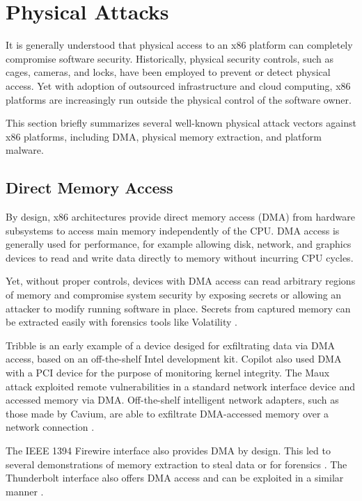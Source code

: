 \section{Physical Attacks}
\label{sec:physical}

It is generally understood that physical access to an x86 platform can
completely compromise software security. Historically, physical
security controls, such as cages, cameras, and locks, have been employed to
prevent or detect physical access. Yet with adoption of
outsourced infrastructure and cloud computing, x86 platforms are
increasingly run outside the physical control of the software owner.

This section briefly summarizes several well-known physical attack vectors
against x86 platforms, including DMA, physical memory extraction, and
platform malware.

\subsection{Direct Memory Access}

By design, x86 architectures provide direct memory access (DMA) from
hardware subsystems to access main memory independently of the
CPU. DMA access is generally used for performance, for example
allowing disk, network, and graphics devices to read and write
data directly to memory without incurring CPU cycles.

Yet, without proper controls, devices with DMA access can read
arbitrary regions of memory and compromise system security by exposing
secrets or allowing an attacker to modify running software in
place. Secrets from captured memory can be extracted easily with
forensics tools like Volatility \cite{Volatility:2014}.

Tribble \cite{Carrier:2004hardware, Grand:2007patent} is an
early example of a device desiged for exfiltrating data via DMA
access, based on an off-the-shelf Intel development kit. Copilot
\cite{Petroni:2004copilot} also used DMA with a PCI device for the
purpose of monitoring kernel integrity. The Maux attack
\cite{Triulzi:2008vd} exploited remote vulnerabilities in a standard
network interface device and accessed memory via DMA. Off-the-shelf
intelligent network adapters, such as those made by Cavium, are able
to exfiltrate DMA-accessed memory over a network connection
\cite{Horovitz:2013physical}.

The IEEE 1394 Firewire interface also provides DMA by design. This led
to several demonstrations of memory extraction to steal data or for
forensics \cite{Dornseif:20040wned, Boileau:2006we,
  Witherden:2010forensics, Dornseif:2005firewire}. The Thunderbolt
interface also offers DMA access and can be exploited in a similar
manner \cite{Maartmann:2011inception}.

